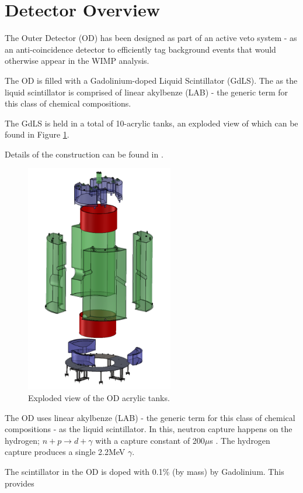 \section{Detector Overview} \label{OD_detector_overview}

\par
The Outer Detector (OD) has been designed as part of an active veto system - as an anti-coincidence detector to efficiently tag background events that would otherwise appear in the WIMP analysis.

\par
The OD is filled with a Gadolinium-doped Liquid Scintillator (GdLS).
The as the liquid scintillator is comprised of linear akylbenze (LAB) - the generic term for this class of chemical compositions.


\par
The GdLS is held in a total of 10-acrylic tanks, an exploded view of which can be found in Figure \ref{fig:LZ_OD_Tanks}.

Details of the construction can be found in \cite{scotthaselschwardt_thesis_ref}.
\begin{figure}
    \centering
    \includegraphics[height=10cm]{Figures/LZ/OD_Tanks_CAD.png}
    \caption{Exploded view of the OD acrylic tanks.}
    \label{fig:LZ_OD_Tanks}
\end{figure}


\par
The OD uses linear akylbenze (LAB) - the generic term for this class of chemical compositions - as the liquid scintillator.
In this, neutron capture happens on the hydrogen; $n + p \xrightarrow{} d + \gamma$ with a capture constant of 200$\mu$s \cite{LZ_TechnicalDesignReview_ref}.
The hydrogen capture produces a single 2.2MeV $\gamma$.
\par
The scintillator in the OD is doped with 0.1\% (by mass) by Gadolinium.
This provides 


